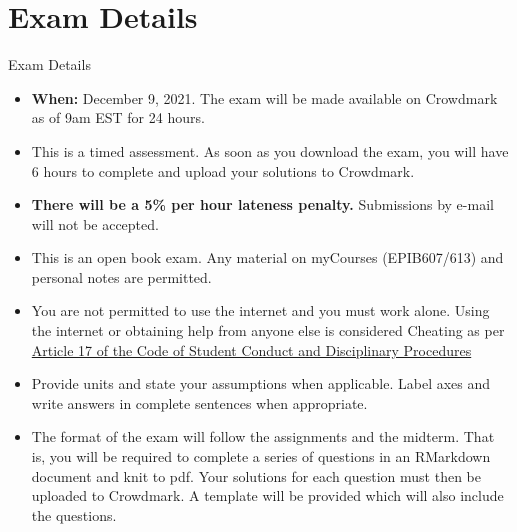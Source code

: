 \documentclass[10pt,handout]{beamer}\usepackage[]{graphicx}\usepackage[]{color}
\begin{document}
\section{Exam Details}
\begin{frame}{Exam Details}
	\small
		\begin{itemize}
		\item \textbf{When:} December 9, 2021. The exam will be made available on Crowdmark as of 9am EST for 24 hours. 
		\item This is a timed assessment. As soon as you download the exam, you will have 6 hours to complete and upload your solutions to Crowdmark. 
		\item \textbf{There will be a 5\% per hour lateness penalty.} Submissions by e-mail will not be accepted.
		\item This is an open book exam. Any material on myCourses (EPIB607/613) and personal notes are permitted.
		\item You are not permitted to use the internet and you must work alone. Using the internet or obtaining help from anyone else is considered Cheating as per \href{https://www.mcgill.ca/students/srr/academicrights/integrity/cheating}{Article 17 of the Code of Student Conduct and Disciplinary Procedures}
		\item Provide units and state your assumptions when applicable. Label axes and write answers in complete sentences when appropriate.
		\item The format of the exam will follow the assignments and the midterm. That is, you will be required to complete a series of questions in an RMarkdown document and knit to pdf. Your solutions for each question must then be uploaded to Crowdmark. A template will be provided which will also include the questions. 
	\end{itemize}
	
\end{frame}
\end{document}
